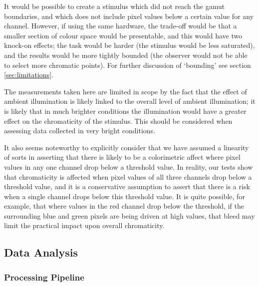 It would be possible to create a stimulus which did not reach the gamut boundaries, and which does not include pixel values below a certain value for any channel. However, if using the same hardware, the trade-off would be that a smaller section of colour space would be presentable, and this would have two knock-on effects; the task would be harder (the stimulus would be less saturated), and the results would be more tightly bounded (the observer would not be able to select more chromatic points). For further discussion of `bounding' see section \ref{sec:limitations}.

The measurements taken here are limited in scope by the fact that the effect of ambient illumination is likely linked to the overall level of ambient illumination; it is likely that in much brighter conditions the illumination would have a greater effect on the chromaticity of the stimulus. This should be considered when assessing data collected in very bright conditions.

It also seems noteworthy to explicitly consider that we have assumed a linearity of sorts in asserting that there is likely to be a colorimetric affect where pixel values in any one channel drop below a threshold value. In reality, our tests show that chromaticity is affected when pixel values of all three channels drop below a threshold value, and it is a conservative assumption to assert that there is a risk when a single channel drops below this threshold value. It is quite possible, for example, that where values in the red channel drop below the threshold, if the surrounding blue and green pixels are being driven at high values, that bleed may limit the practical impact upon overall chromaticity.


\subsection{Data Analysis}
\subsubsection{Processing Pipeline} \label{sec:processing}

